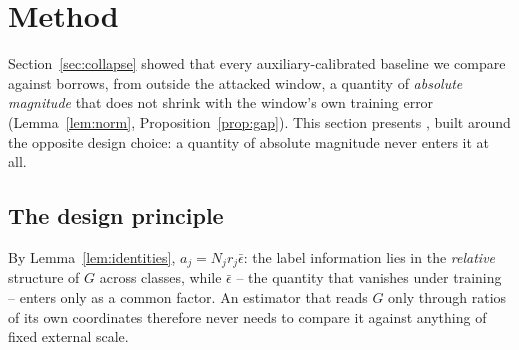 %
%
%
%

\section{Method}
\label{sec:method}

Section~\ref{sec:collapse} showed that every auxiliary-calibrated
baseline we compare against borrows, from outside the attacked window, a
quantity of \emph{absolute magnitude} that does not shrink with the
window's own training error (Lemma~\ref{lem:norm}, Proposition~\ref{prop:gap}).
This section presents \ourmethod{}, built around the opposite design
choice: a quantity of absolute magnitude never enters it at all.

\subsection{The design principle}

By Lemma~\ref{lem:identities}, $a_j = N_j r_j\bar\epsilon$: the label
information lies in the \emph{relative} structure of $G$ across classes,
while $\bar\epsilon$ -- the quantity that vanishes under training --
enters only as a common factor. An estimator that reads $G$ only through
ratios of its own coordinates therefore never needs to compare it against
anything of fixed external scale.

